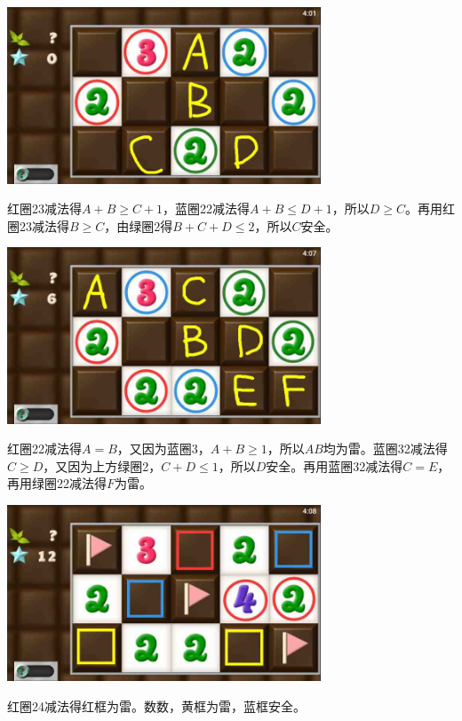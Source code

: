 \subsection{} %
\begin{center}
    \includegraphics[width=0.7\textwidth]{puzzlelow/100-1.jpg}
\end{center}
红圈23减法得$A+B\ge C+1$，蓝圈22减法得$A+B\le D+1$，所以$D\ge C$。再用红圈23减法得$B\ge C$，由绿圈2得$B+C+D\le 2$，所以$C$安全。
\begin{center}
    \includegraphics[width=0.7\textwidth]{puzzlelow/100-2.jpg}
\end{center}
红圈22减法得$A=B$，又因为蓝圈3，$A+B\ge 1$，所以$AB$均为雷。蓝圈32减法得$C\ge D$，又因为上方绿圈2，$C+D\le 1$，所以$D$安全。再用蓝圈32减法得$C=E$，再用绿圈22减法得$F$为雷。
\begin{center}
    \includegraphics[width=0.7\textwidth]{puzzlelow/100-3.jpg}
\end{center}
红圈24减法得红框为雷。数数，黄框为雷，蓝框安全。

